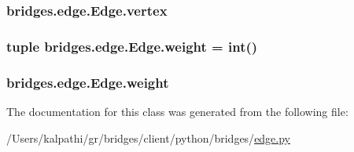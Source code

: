 \subsubsection[{vertex}]{\setlength{\rightskip}{0pt plus 5cm}bridges.\+edge.\+Edge.\+vertex}\label{classbridges_1_1edge_1_1_edge_af894a206ef35d03cdb75faea83a0fc5a}
\hypertarget{classbridges_1_1edge_1_1_edge_a4e5e58a10166fb6043c0b8db8dbda5a2}{}
\subsubsection[{weight}]{\setlength{\rightskip}{0pt plus 5cm}tuple bridges.\+edge.\+Edge.\+weight = int()\hspace{0.3cm}{\ttfamily [static]}}\label{classbridges_1_1edge_1_1_edge_a4e5e58a10166fb6043c0b8db8dbda5a2}
\hypertarget{classbridges_1_1edge_1_1_edge_a1137b3a75c3bffd6cfccb994fd9a5c13}{}
\subsubsection[{weight}]{\setlength{\rightskip}{0pt plus 5cm}bridges.\+edge.\+Edge.\+weight}\label{classbridges_1_1edge_1_1_edge_a1137b3a75c3bffd6cfccb994fd9a5c13}


The documentation for this class was generated from the following file\+:\begin{DoxyCompactItemize}
\item 
/\+Users/kalpathi/gr/bridges/client/python/bridges/\hyperlink{edge_8py}{edge.\+py}\end{DoxyCompactItemize}
